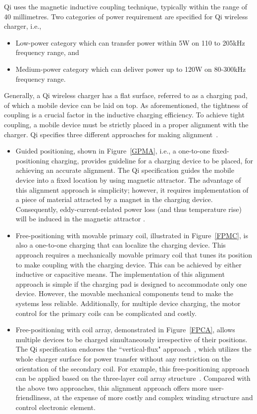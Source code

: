 \documentclass[twocolumn,10pt]{IEEEtran}
\begin{document}
Qi uses the magnetic inductive coupling technique, typically within the range of 40 millimetres. Two categories of power requirement are specified for Qi wireless charger, i.e.,  
\begin{itemize}
	\item Low-power category which can transfer power within 5W on 110 to 205kHz frequency range, and
	\item Medium-power category which can deliver power up to 120W on 80-300kHz frequency range.
\end{itemize}
Generally, a Qi wireless charger has a flat surface, referred to as a charging pad, of which a mobile device can be laid on top. As aforementioned, the tightness of coupling is a crucial factor in the inductive charging efficiency. To achieve tight coupling, a mobile device must be strictly placed in a proper alignment with the charger. Qi specifies three different approaches for making alignment~\cite{WPC_Qi}.
\begin{itemize}
	\item Guided positioning, shown in Figure~\ref{GPMA}, i.e., a one-to-one fixed-positioning charging, provides guideline for a charging device to be placed, for achieving an accurate alignment. The Qi specification guides the mobile device into a fixed location by using magnetic attractor. The advantage of this alignment approach is simplicity; however, it requires implementation of a piece of material attracted by a magnet in the charging device. Consequently, eddy-current-related power loss (and thus temperature rise) will be induced in the magnetic attractor \cite{X.2011Zhong}.    

	\item Free-positioning with movable primary coil, illustrated in Figure~\ref{FPMC}, is also a one-to-one charging that can localize the charging device. This approach requires a mechanically movable primary coil that tunes its position to make coupling with the charging device. This can be achieved by either inductive or capacitive means. The implementation of this alignment approach is simple if the charging pad is designed to accommodate only one device. However, the movable mechanical components tend to make the systems less reliable. Additionally, for multiple device charging, the motor control for the primary coils can be complicated and costly. 

	\item Free-positioning with coil array, demonstrated in Figure~\ref{FPCA}, allows multiple devices to be charged simultaneously irrespective of their positions.  The Qi specification endorses the ``vertical-flux" approach~\cite{R.2007Hui}, which utilizes the whole charger surface for power transfer without any restriction on the orientation of the secondary coil. For example, this free-positioning approach can be applied based on the three-layer coil array structure~\cite{R.2005Hui}. Compared with the above two approaches, this alignment approach offers more user-friendliness, at the expense of more costly and complex winding structure and control electronic element.
 
\end{itemize}
\end{document}
